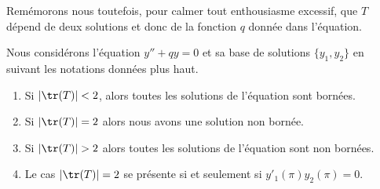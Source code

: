 Remémorons nous toutefois, pour calmer tout enthousiasme excessif, que \( T\) dépend de deux solutions et donc de la fonction \( q\) donnée dans l'équation.

\begin{proposition} \label{PropGJCZcjR}
	Nous considérons l'équation \( y''+qy=0\) et sa base de solutions \( \{ y_1,y_2 \}\) en suivant les notations données plus haut.
	\begin{enumerate}
		\item
		      Si \( | \tr(T) |<2\), alors toutes les solutions de l'équation sont bornées.
		\item
		      Si \( | \tr(T) |=2\) alors nous avons une solution non bornée.
		\item
		      Si \( |\tr(T)|>2\) alors toutes les solutions de l'équation sont non bornées.
		\item
		      Le cas \( | \tr(T) |=2\) se présente si et seulement si \( y'_1(\pi)y_2(\pi)=0\).
	\end{enumerate}
\end{proposition}


